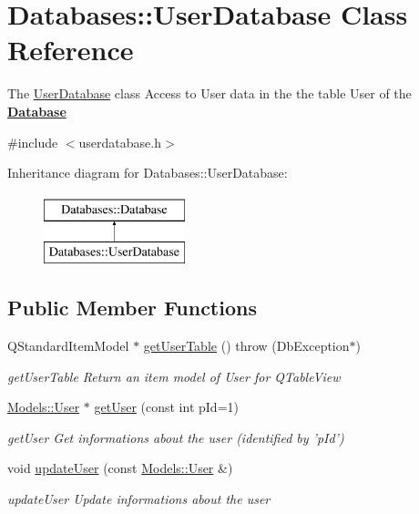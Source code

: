 \hypertarget{classDatabases_1_1UserDatabase}{\section{Databases\-:\-:User\-Database Class Reference}
\label{classDatabases_1_1UserDatabase}
}


The \hyperlink{classDatabases_1_1UserDatabase}{User\-Database} class Access to User data in the the table User of the {\bfseries \hyperlink{classDatabases_1_1Database}{Database}}  




{\ttfamily \#include $<$userdatabase.\-h$>$}

Inheritance diagram for Databases\-:\-:User\-Database\-:\begin{figure}[H]
\begin{center}
\leavevmode
\includegraphics[height=2.000000cm]{d0/d33/classDatabases_1_1UserDatabase}
\end{center}
\end{figure}
\subsection*{Public Member Functions}
\begin{DoxyCompactItemize}
\item 
Q\-Standard\-Item\-Model $\ast$ \hyperlink{classDatabases_1_1UserDatabase_a7545310accf573181c257861328e07d3}{get\-User\-Table} ()  throw (\-Db\-Exception$\ast$)
\begin{DoxyCompactList}\small\item\em get\-User\-Table Return an item model of User for Q\-Table\-View \end{DoxyCompactList}\item 
\hyperlink{classModels_1_1User}{Models\-::\-User} $\ast$ \hyperlink{classDatabases_1_1UserDatabase_a476a2b649cc61870a59d6f8df0b376e4}{get\-User} (const int p\-Id=1)
\begin{DoxyCompactList}\small\item\em get\-User Get informations about the user (identified by 'p\-Id') \end{DoxyCompactList}\item 
\hypertarget{classDatabases_1_1UserDatabase_a79cd7ce66a5dc13f91a59eb106edd871}{void \hyperlink{classDatabases_1_1UserDatabase_a79cd7ce66a5dc13f91a59eb106edd871}{update\-User} (const \hyperlink{classModels_1_1User}{Models\-::\-User} \&)}\label{classDatabases_1_1UserDatabase_a79cd7ce66a5dc13f91a59eb106edd871}

\begin{DoxyCompactList}\small\item\em update\-User Update informations about the user \end{DoxyCompactList}\end{DoxyCompactItemize}
